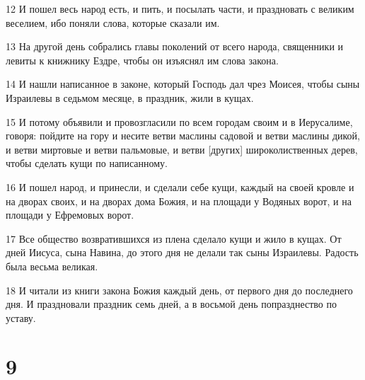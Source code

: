 \par 12 И пошел весь народ есть, и пить, и посылать части, и праздновать с великим веселием, ибо поняли слова, которые сказали им.
\par 13 На другой день собрались главы поколений от всего народа, священники и левиты к книжнику Ездре, чтобы он изъяснял им слова закона.
\par 14 И нашли написанное в законе, который Господь дал чрез Моисея, чтобы сыны Израилевы в седьмом месяце, в праздник, жили в кущах.
\par 15 И потому объявили и провозгласили по всем городам своим и в Иерусалиме, говоря: пойдите на гору и несите ветви маслины садовой и ветви маслины дикой, и ветви миртовые и ветви пальмовые, и ветви [других] широколиственных дерев, чтобы сделать кущи по написанному.
\par 16 И пошел народ, и принесли, и сделали себе кущи, каждый на своей кровле и на дворах своих, и на дворах дома Божия, и на площади у Водяных ворот, и на площади у Ефремовых ворот.
\par 17 Все общество возвратившихся из плена сделало кущи и жило в кущах. От дней Иисуса, сына Навина, до этого дня не делали так сыны Израилевы. Радость была весьма великая.
\par 18 И читали из книги закона Божия каждый день, от первого дня до последнего дня. И праздновали праздник семь дней, а в восьмой день попразднество по уставу.

\chapter{9}


